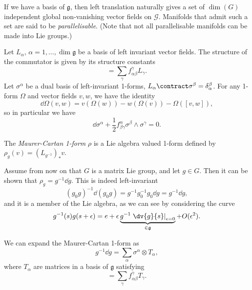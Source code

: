 \documentclass{jknotes}
\begin{document}
If we have a basis of \(\mathfrak{g}\), then left translation naturally gives a set of \(\dim(G)\) independent global non-vanishing vector fields on \(\mathcal{G}\). Manifolds that admit such a set are said to be \emph{parallelisable}. (Note that not all parallelisable manifolds can be made into Lie groups.)

Let \(L_\alpha\), \(\alpha=1,\dots,\dim\mathfrak{g}\) be a basis of left invariant vector fields. The structure of the commutator is given by its structure constants
\begin{equation}
    [L_\alpha,L_\beta] = \sum_\gamma f^\gamma_{\alpha\beta} L_\gamma.
\end{equation}
Let \(\sigma^\alpha\) be a dual basis of left-invariant 1-forms, \(L_\alpha\contract\sigma^\beta = \delta^\beta_\alpha\). For any 1-form \(\Omega\) and vector fields \(v,w\), we have the identity
\begin{equation}
    \dd{\Omega}(v,w) = v(\Omega(w)) - w(\Omega(v)) - \Omega([v,w]),
\end{equation}
so in particular we have
\begin{equation}
    \dd{\sigma^\alpha} + \frac{1}{2}f^\alpha_{\beta\gamma}\sigma^\beta\wedge\sigma^\gamma = 0.
    \label{dualleft}
    \tag{\(*\)}
\end{equation}

\begin{defn}
    The \emph{Maurer-Cartan 1-form} \(\rho\) is a Lie algebra valued 1-form defined by \(\rho_g(v) = (L_{g^{-1}})_*v\).
\end{defn}
Assume from now on that \(G\) is a matrix Lie group, and let \(g \in G\). Then it can be shown that \(\rho_g=g^{-1}\dd{g}\). This is indeed left-invariant
\begin{equation}
    (g_0g)^{-1}\dd{(g_0g)} = g^{-1}g_0^{-1}g_0\dd{g} = g^{-1}\dd{g},
\end{equation}
and it is a member of the Lie algebra, as we can see by considering the curve
\begin{equation}
    g^{-1}(s)g(s+\epsilon) = e + \epsilon \underbrace{g^{-1}\left.\dv{g}{s}\right|_{\epsilon=0}}_{\in\mathfrak{g}} + O(\epsilon^2).
\end{equation}

We can expand the Maurer-Cartan 1-form as
\begin{equation}
    g^{-1}\dd{g} = \sum_\alpha\sigma^\alpha\otimes T_\alpha,
\end{equation}
where \(T_\alpha\) are matrices in a basis of \(\mathfrak{g}\) satisfying
\begin{equation}
    [T_\alpha,T_\beta] = \sum_\gamma f_{\alpha\beta}^\gamma T_\gamma.
\end{equation}
\end{document}

